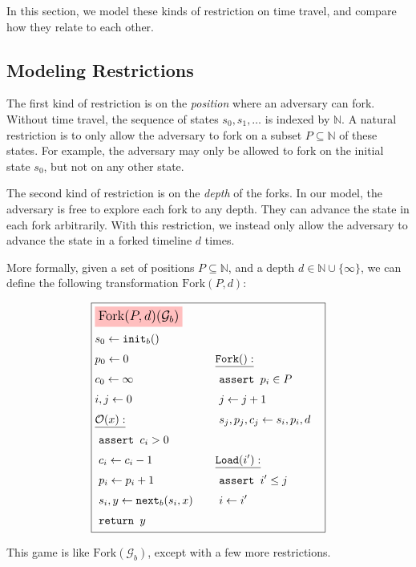 In this section, we model these kinds of restriction on time travel,
and compare how they relate to each other.

\subsection{Modeling Restrictions}

The first kind of restriction is on the \emph{position} where an
adversary can fork.
Without time travel, the sequence of states $s_0, s_1, \ldots$
is indexed by $\mathbb{N}$.
A natural restriction is to only allow the adversary to
fork on a subset $P \subseteq \mathbb{N}$ of these states.
For example, the adversary may only be allowed to fork on the initial
state $s_0$, but not on any other state.

The second kind of restriction is on the \emph{depth} of the forks.
In our model, the adversary is free to explore each fork to any depth.
They can advance the state in each fork arbitrarily.
With this restriction, we instead only allow the adversary to advance
the state in a forked timeline $d$ times.

More formally, given a set of positions $P \subseteq \mathbb{N}$, and
a depth
$ d \in \mathbb{N} \cup \{\infty\}$, we can define the following
transformation $\text{Fork}(P, d)$:

\begin{game}
\captionsetup{justification=centering}
$$
\boxed{
\begin{aligned}
&\colorbox{pink}{\large $\text{Fork}(P, d)(\mathcal{G}_b)$}\cr
&\begin{aligned}
    &s_0 \gets \texttt{init}_b()\cr
    &p_0 \gets 0\cr
    &c_0 \gets \infty\cr
    &i, j \gets 0\cr
    &\underline{\mathcal{O}(x):}\cr
    &\ \texttt{assert } c_i > 0\cr
    &\ c_i \gets c_i - 1\cr
    &\ p_i \gets p_i + 1\cr
    &\ s_i, y \gets \texttt{next}_b(s_i, x)\cr
    &\ \texttt{return } y\cr
\end{aligned}
&\begin{aligned}
    &\underline{\texttt{Fork}():}\cr
    &\ \texttt{assert } p_i \in P\cr
    &\ j \gets j + 1\cr
    &\ s_j, p_j, c_j \gets s_i, p_i, d\cr
    &\cr
    &\underline{\texttt{Load}(i'):}\cr
    &\ \texttt{assert } i' \leq j\cr
    &\ i \gets i'\cr
\end{aligned}\cr
\end{aligned}
}
$$
\caption{$\text{Fork}(\mathcal{G}_b)$}
\end{game}

This game is like $\text{Fork}(\mathcal{G}_b)$, except with a few more restrictions.

